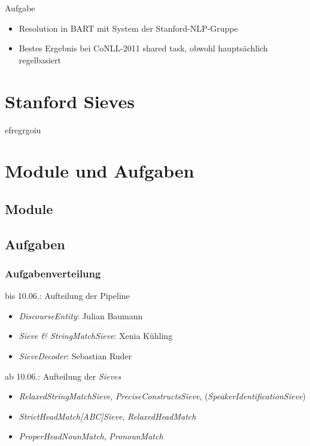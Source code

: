 \documentclass[11pt,a4paper]{beamer}
\begin{document}
\begin{frame}{Aufgabe}
\begin{itemize}
\item Resolution in BART mit System der Stanford-NLP-Gruppe
\item Bestes Ergebnis bei CoNLL-2011 shared task, obwohl hauptsächlich regelbasiert
\end{itemize}
\end{frame}

\section{Stanford Sieves}
\begin{frame}
efregrgoiu
\end{frame}

\section{Module und Aufgaben}

\subsection{Module}

\subsection{Aufgaben}

\begin{frame}
\frametitle{Aufgabenverteilung}

bis 10.06.: Aufteilung der Pipeline 
\begin{itemize}
  \item \textit{DiscourseEntity}: Julian Baumann
  \item \textit{Sieve \& StringMatchSieve}: Xenia Kühling
  \item \textit{SieveDecoder}: Sebastian Ruder
\end{itemize}
ab 10.06.: Aufteilung der \textit{Sieves}
\begin{itemize}
  \item \textit{RelaxedStringMatchSieve}, \textit{PreciseConstructsSieve}, (\textit{SpeakerIdentificationSieve})
  \item \textit{StrictHeadMatch[ABC]Sieve}, \textit{RelaxedHeadMatch}
  \item \textit{ProperHeadNounMatch}, \textit{PronounMatch}
\end{itemize}

\end{frame}
\end{document}
